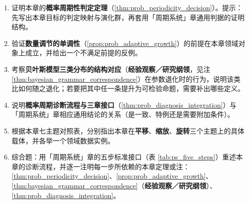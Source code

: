 \begin{enumerate}[leftmargin=3em, label=\textbf{题 \arabic*}]
    \item 证明本章的\textbf{概率周期性判定定理}（\ref{thm:prob_periodicity_decision}）。提示：先写出本章目标的判定映射与演化群，再套用「周期系统」章通用判据的证明结构。

    \item 验证\textbf{数量调节的单调性}（\ref{prop:prob_adaptive_growth}）的前提在本章领域对象上成立，并给出一个不满足前提的反例。

    \item 考察\textbf{贝叶斯模型三类分布的结构对应}（\textbf{经验观察／研究纲领}，见注 \ref{thm:bayesian_grammar_correspondence}）在参数退化时的行为，说明该类比如何随之退化；若要把其中任一条提升为可检验命题，需要补出哪些定义。

    \item 说明\textbf{概率周期诊断流程与三章接口}（\ref{thm:prob_diagnosis_integration}）与「周期系统」章相应通用结论的关系（是一致、特例还是需要附加条件）。

    \item 根据本章七主题对照表，分别指出本章在\textbf{平移}、\textbf{缩放}、\textbf{旋转}三个主题上的具体载体，并各举一个领域数据实例。

    \item 综合题：用「周期系统」章的五步标准接口（表 \ref{tab:ps_five_steps}）重述本章的诊断流程，并逐一注明每一步所依赖的本章定理或注：\ref{thm:prob_periodicity_decision}、\ref{prop:prob_adaptive_growth}、\ref{thm:bayesian_grammar_correspondence}（\textbf{经验观察／研究纲领}）、\ref{thm:prob_diagnosis_integration}。
\end{enumerate}

